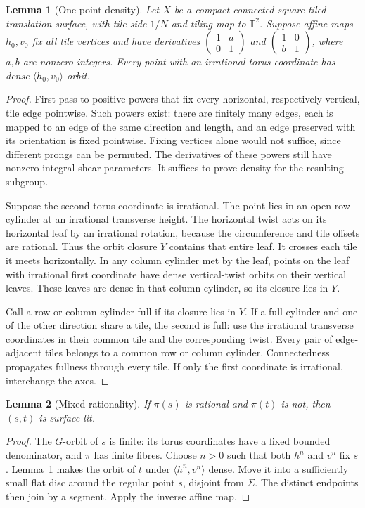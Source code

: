 \documentclass[11pt]{article}
\newtheorem{lemma}{Lemma}
\theoremstyle{remark}
\newcommand{\T}{\mathbb T}
\begin{document}
\begin{lemma}[One-point density]\label{lem:one}
Let $X$ be a compact connected square-tiled translation surface, with tile
side $1/N$ and tiling map to $\T^2$. Suppose affine maps $h_0,v_0$ fix all
tile vertices and have derivatives
$\left(\begin{smallmatrix}1&a\\0&1\end{smallmatrix}\right)$ and
$\left(\begin{smallmatrix}1&0\\b&1\end{smallmatrix}\right)$,
where $a,b$ are nonzero integers. Every point with an irrational torus
coordinate has dense $\langle h_0,v_0\rangle$-orbit.
\end{lemma}
\begin{proof}
First pass to positive powers that fix every horizontal, respectively
vertical, tile edge pointwise. Such powers exist: there are finitely many
edges, each is mapped to an edge of the same direction and length, and
an edge preserved with its orientation is fixed pointwise. Fixing vertices
alone would not suffice, since different prongs can be permuted.
The derivatives of these powers still have nonzero integral shear parameters.
It suffices to prove density for the resulting subgroup.

Suppose the second torus coordinate is irrational. The point lies in an
open row cylinder at an irrational transverse height. The horizontal twist
acts on its horizontal leaf by an irrational rotation, because the
circumference and tile offsets are rational. Thus the orbit closure $Y$
contains that entire leaf. It crosses each tile it meets horizontally.
In any column cylinder met by the leaf, points on the leaf with irrational
first coordinate have dense vertical-twist orbits on their vertical leaves.
These leaves are dense in that column cylinder, so its closure lies in $Y$.

Call a row or column cylinder full if its closure lies in $Y$. If a full
cylinder and one of the other direction share a tile, the second is full:
use the irrational transverse coordinates in their common tile and the
corresponding twist. Every pair of edge-adjacent tiles belongs to a common
row or column cylinder. Connectedness propagates fullness through every
tile. If only the first coordinate is irrational, interchange the axes.
\end{proof}

\begin{lemma}[Mixed rationality]\label{lem:mixed}
If $\pi(s)$ is rational and $\pi(t)$ is not, then $(s,t)$ is surface-lit.
\end{lemma}
\begin{proof}
The $G$-orbit of $s$ is finite: its torus coordinates have a fixed bounded
denominator, and $\pi$ has finite fibres. Choose $n>0$ such that both
$h^n$ and $v^n$ fix $s$. Lemma~\ref{lem:one} makes the orbit of $t$ under
$\langle h^n,v^n\rangle$ dense. Move it into a sufficiently small flat disc
around the regular point $s$, disjoint from $\Sigma$. The distinct endpoints
then join by a segment. Apply the inverse affine map.
\end{proof}
\end{document}
